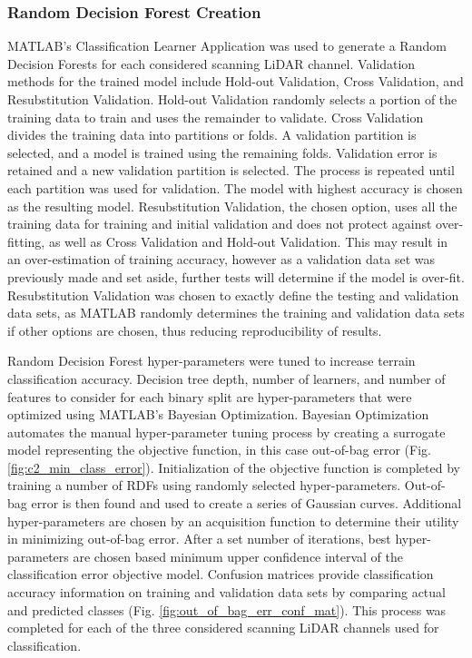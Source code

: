 \documentclass[numbered,pdftex]{ohio-etd}
\begin{document}
{{{{			} %
			
			\subsubsection{Random Decision Forest Creation}\label{sec:random-decision-forest-creation}{
				
				{MATLAB's Classification Learner Application was used to generate a Random Decision Forests for each considered scanning LiDAR channel. Validation methods for the trained model include Hold-out Validation, Cross Validation, and Resubstitution Validation. Hold-out Validation randomly selects a portion of the training data to train and uses the remainder to validate. Cross Validation divides the training data into partitions or folds. A validation partition is selected, and a model is trained using the remaining folds. Validation error is retained and a new validation partition is selected. The process is repeated until each partition was used for validation. The model with highest accuracy is chosen as the resulting model. Resubstitution Validation, the chosen option, uses all the training data for training and initial validation and does not protect against over-fitting, as well as Cross Validation and Hold-out Validation. This may result in an over-estimation of training accuracy, however as a validation data set was previously made and set aside, further tests will determine if the model is over-fit. Resubstitution Validation was chosen to exactly define the testing and validation data sets, as MATLAB randomly determines the training and validation data sets if other options are chosen, thus reducing reproducibility of results.}
				
				{Random Decision Forest hyper-parameters were tuned to increase terrain classification accuracy. Decision tree depth, number of learners, and number of features to consider for each binary split are hyper-parameters that were optimized using MATLAB's Bayesian Optimization. Bayesian Optimization automates the manual hyper-parameter tuning process by creating a surrogate model representing the objective function, in this case out-of-bag error (Fig. \ref{fig:c2_min_class_error}). Initialization of the objective function is completed by training a number of RDFs using randomly selected hyper-parameters. Out-of-bag error is then found and used to create a series of Gaussian curves. Additional hyper-parameters are chosen by an acquisition function to determine their utility in minimizing out-of-bag error. After a set number of iterations, best hyper-parameters are chosen based minimum upper confidence interval of the classification error objective model. Confusion matrices provide classification accuracy information on training and validation data sets by comparing actual and predicted classes (Fig. \ref{fig:out_of_bag_err_conf_mat}). This process was completed for each of the three considered scanning LiDAR channels used for classification.}
					
}}}}
\end{document}
